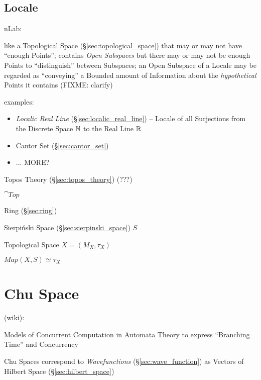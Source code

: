 \subsection{Locale}\label{sec:locale}

nLab:

like a Topological Space (\S\ref{sec:topological_space}) that may or may not
have ``enough Points''; contains \emph{Open Subspaces} but there may or may not
be enough Points to ``distinguish'' between Subspaces; an Open Subspace of a
Locale may be regarded as ``conveying'' a Bounded amount of Information about
the \emph{hypothetical} Points it contains (FIXME: clarify)

examples:
\begin{itemize}
  \item \emph{Localic Real Line} (\S\ref{sec:localic_real_line}) -- Locale of
    all Surjections from the Discrete Space $\mathbb{N}$ to the Real Line $\mathbb{R}$
  \item Cantor Set (\S\ref{sec:cantor_set})
  \item ... MORE?
\end{itemize}

Topos Theory (\S\ref{sec:topos_theory}) (???)

$\cat{Top}$

Ring (\S\ref{sec:ring})

Sierpi\'nski Space (\S\ref{sec:sierpinski_space}) $S$

Topological Space $X = (M_X,\tau_X)$

$Map(X,S) \simeq \tau_X$



\section{Chu Space}\label{sec:chu_space}

(wiki):

Models of Concurrent Computation in Automata Theory to express ``Branching
Time'' and Concurrency

Chu Spaces correspond to \emph{Wavefunctions} (\S\ref{sec:wave_function}) as
Vectors of Hilbert Space (\S\ref{sec:hilbert_space})



